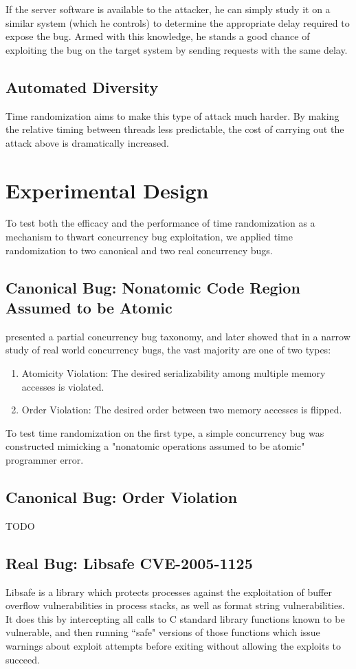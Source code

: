 \documentclass[letterpaper,twocolumn,10pt]{article}
\begin{document}
If the server software is available to the attacker, he can simply study it on a similar system (which he controls) to determine the appropriate delay required to expose the bug.
Armed with this knowledge, he stands a good chance of exploiting the bug on the target system by sending requests with the same delay.
\subsection{Automated Diversity}
Time randomization aims to make this type of attack much harder.
By making the relative timing between threads less predictable, the cost of carrying out the attack above is dramatically increased.

\section{Experimental Design}
To test both the efficacy and the performance of time randomization as a mechanism to thwart concurrency bug exploitation, we applied time randomization to two canonical and two real concurrency bugs.
\subsection{Canonical Bug: Nonatomic Code Region Assumed to be Atomic}
\cite{Farchi2003} presented a partial concurrency bug taxonomy, and \cite{Lu2008} later showed that in a narrow study of real world concurrency bugs, the vast majority are one of two types:
\begin{enumerate}
	\item Atomicity Violation: The desired serializability among multiple memory accesses is violated.
	\item Order Violation: The desired order between two memory accesses is flipped.
\end{enumerate}
To test time randomization on the first type, a simple concurrency bug was constructed mimicking a "nonatomic operations assumed to be atomic" programmer error.
\subsection{Canonical Bug: Order Violation}
TODO
\subsection{Real Bug: Libsafe CVE-2005-1125}
Libsafe is a library which protects processes against the exploitation of buffer overflow vulnerabilities in process stacks, as well as format string vulnerabilities.  It does this by intercepting all calls to C standard library functions known to be vulnerable, and then running ``safe" versions of those functions which issue warnings about exploit attempts before exiting without allowing the exploits to succeed.
\end{document}
